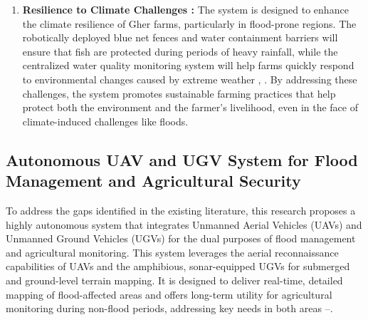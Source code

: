 \documentclass[conference]{IEEEtran}
\begin{document}
\begin{enumerate}
	
	\item \textbf{Resilience to Climate Challenges : }
	The system is designed to enhance the climate resilience of Gher farms, particularly in flood-prone regions. The robotically deployed blue net fences and water containment barriers will ensure that fish are protected during periods of heavy rainfall, while the centralized water quality monitoring system will help farms quickly respond to environmental changes caused by extreme weather \cite{ref23}, \cite{ref24}. By addressing these challenges, the system promotes sustainable farming practices that help protect both the environment and the farmer’s livelihood, even in the face of climate-induced challenges like floods.
	
\end{enumerate}


\subsection{\textbf{Autonomous UAV and UGV System for Flood Management and Agricultural Security}}
To address the gaps identified in the existing literature, this research proposes a highly autonomous system that integrates Unmanned Aerial Vehicles (UAVs) and Unmanned Ground Vehicles (UGVs) for the dual purposes of flood management and agricultural monitoring. This system leverages the aerial reconnaissance capabilities of UAVs and the amphibious, sonar-equipped UGVs for submerged and ground-level terrain mapping. It is designed to deliver real-time, detailed mapping of flood-affected areas and offers long-term utility for agricultural monitoring during non-flood periods, addressing key needs in both areas \cite{ref1}–\cite{ref3}.
\end{document}
